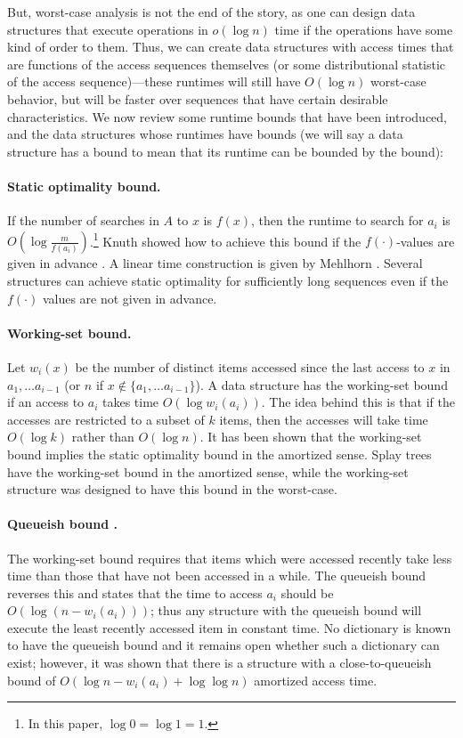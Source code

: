 \documentclass{llncs}
\newcommand{\BigOh}[1]{O\!\left(#1\right)}
\newcommand{\LittleOh}[1]{o\!\left(#1\right)}
\begin{document}
But, worst-case analysis is not the end of the story, as one can design data structures that execute operations in $\LittleOh{\log n}$ time if the operations have some kind of order to them. Thus, we can create data structures with access times that are functions of the access sequences themselves (or some distributional statistic of the access sequence)---these runtimes will still have $\BigOh{\log n}$ worst-case behavior, but will be faster over sequences that have certain desirable characteristics. We now review some runtime bounds that have been introduced, and the data structures whose runtimes have bounds (we will say a data structure has a bound to mean that its runtime can be bounded by the bound):

\paragraph{Static optimality bound.} If the number of searches in $A$ to $x$ is $f(x)$, then the runtime to search for $a_i$ is $\BigOh{\log \frac{m}{f(a_i)}}$.\footnote{In this paper,  $\log 0=\log 1=1$.} Knuth showed how to achieve this bound if the $f(\cdot)$-values are given in advance \cite{DBLP:journals/acta/Knuth71}. A linear time construction is given by Mehlhorn \cite{mXX}.  Several structures can achieve static optimality for sufficiently long sequences even if the $f(\cdot)$ values are not given in advance.

\paragraph{Working-set bound.} Let $w_i(x)$ be the number of distinct items accessed since the last access to $x$ in $a_1, \ldots a_{i-1}$ (or $n$ if $x \notin \{a_1, \ldots a_{i-1}\}$). A data structure has the working-set bound if an access to $a_i$ takes time $\BigOh{\log w_i(a_i)}$. The idea behind this is that if the accesses are restricted to a subset of $k$ items, then the accesses will take time $\BigOh{\log k}$ rather than $\BigOh{\log n}$. It has been shown that the working-set bound implies the static optimality bound in the amortized sense. Splay trees \cite{DBLP:journals/jacm/SleatorT85} have the working-set bound in the amortized sense, while the working-set structure \cite{DBLP:conf/soda/Iacono01a} was designed to have this bound in the worst-case.

\paragraph{Queueish bound \cite{DBLP:journals/algorithmica/IaconoL05}.} The working-set bound requires that items which were accessed recently take less time than those that have not been accessed in a while. The queueish bound reverses this and states that the time to access $a_i$ should be $\BigOh{\log( n-w_i(a_i))}$; thus any structure with the queueish bound will execute the least recently accessed item in constant time. No dictionary is known to have the queueish bound and it remains open whether such a dictionary can exist; however, it was shown that there is a structure with a close-to-queueish bound of $\BigOh{\log n-w_i(a_i)+\log \log n}$ amortized access time.
\end{document}
